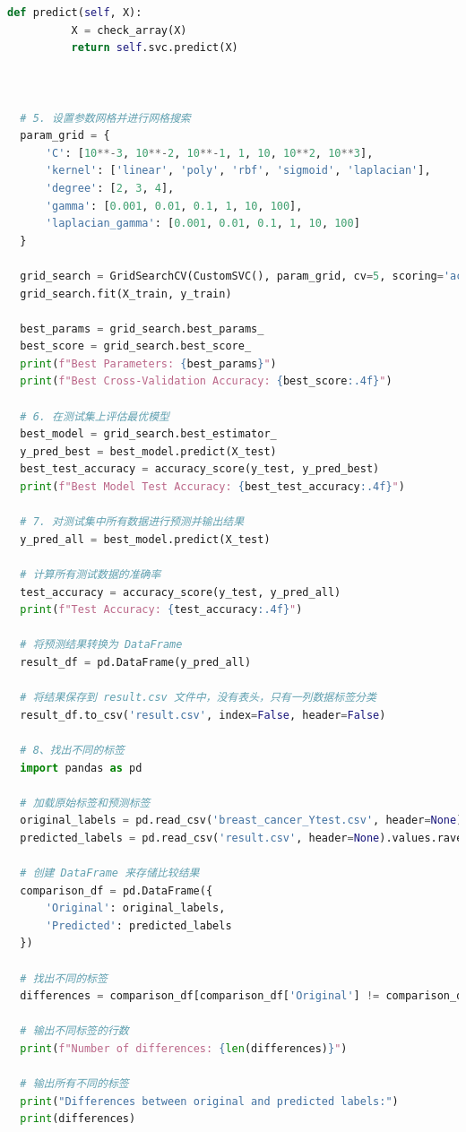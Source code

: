 \documentclass[12pt]{article}
\begin{document}
\begin{lstlisting}[language=python]
      def predict(self, X):
          X = check_array(X)
          return self.svc.predict(X)
      
  
  
  # 5. 设置参数网格并进行网格搜索
  param_grid = {
      'C': [10**-3, 10**-2, 10**-1, 1, 10, 10**2, 10**3],
      'kernel': ['linear', 'poly', 'rbf', 'sigmoid', 'laplacian'],
      'degree': [2, 3, 4],
      'gamma': [0.001, 0.01, 0.1, 1, 10, 100],
      'laplacian_gamma': [0.001, 0.01, 0.1, 1, 10, 100]
  }
  
  grid_search = GridSearchCV(CustomSVC(), param_grid, cv=5, scoring='accuracy')
  grid_search.fit(X_train, y_train)
  
  best_params = grid_search.best_params_
  best_score = grid_search.best_score_
  print(f"Best Parameters: {best_params}")
  print(f"Best Cross-Validation Accuracy: {best_score:.4f}")
  
  # 6. 在测试集上评估最优模型
  best_model = grid_search.best_estimator_
  y_pred_best = best_model.predict(X_test)
  best_test_accuracy = accuracy_score(y_test, y_pred_best)
  print(f"Best Model Test Accuracy: {best_test_accuracy:.4f}")
  
  # 7. 对测试集中所有数据进行预测并输出结果
  y_pred_all = best_model.predict(X_test)
  
  # 计算所有测试数据的准确率
  test_accuracy = accuracy_score(y_test, y_pred_all)
  print(f"Test Accuracy: {test_accuracy:.4f}")
  
  # 将预测结果转换为 DataFrame
  result_df = pd.DataFrame(y_pred_all)
  
  # 将结果保存到 result.csv 文件中，没有表头，只有一列数据标签分类
  result_df.to_csv('result.csv', index=False, header=False)
  
  # 8、找出不同的标签
  import pandas as pd
  
  # 加载原始标签和预测标签
  original_labels = pd.read_csv('breast_cancer_Ytest.csv', header=None).values.ravel()
  predicted_labels = pd.read_csv('result.csv', header=None).values.ravel()
  
  # 创建 DataFrame 来存储比较结果
  comparison_df = pd.DataFrame({
      'Original': original_labels,
      'Predicted': predicted_labels
  })
  
  # 找出不同的标签
  differences = comparison_df[comparison_df['Original'] != comparison_df['Predicted']]
  
  # 输出不同标签的行数
  print(f"Number of differences: {len(differences)}")
  
  # 输出所有不同的标签
  print("Differences between original and predicted labels:")
  print(differences)  
  
\end{lstlisting}
\end{document}
